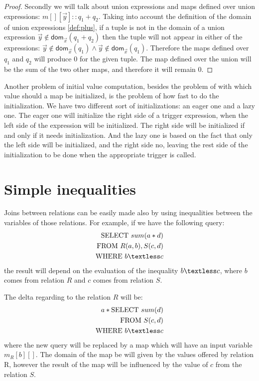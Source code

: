 \documentclass[12pt]{article}
\newcommand{\dom}{\textsf{dom}}
\begin{document}
\begin{proof}
Secondly we will talk about union expressions and maps defined over union expressions: $m[][\vec{y}]::q_1+q_2$. Taking into account the definition of the domain of union expressions \ref{def:plus}, if a tuple is not in the domain of a union expression $\vec{y}\notin\dom{}_{\vec{x}}(q_1+q_2)$ then the tuple will not appear in either of the expressions: $\vec{y}\notin\dom{}_{\vec{x}}(q_1)\land \vec{y}\notin\dom{}_{\vec{x}}(q_1)$. Therefore the maps defined over $q_1$ and $q_2$ will produce 0 for the given tuple. The map defined over the union will be the sum of the two other maps, and therefore it will remain 0.
\end{proof}

Another problem of initial value computation, besides the problem of with which value should a map be initialized, is the problem of how fast to do the initialization. We have two different sort of initializations: an eager one and a lazy one. The eager one will initialize the right side of a trigger expression, when the left side of the expression will be initialized. The right side will be initialized if and only if it needs initialization. And the lazy one is based on the fact that only the left side will be initialized, and the right side no, leaving the rest side of the initialization to be done when the appropriate trigger is called.

\section{Simple inequalities}

Joins between relations can be easily made also by using inequalities between the variables of those relations. For example, if we have the following query:
\begin{align*}
\mbox{SELECT }sum(a*d)\\
\mbox{FROM } R(a,b),S(c,d)\\
\mbox{WHERE } b\textless c 
\end{align*}
the result will depend on the evaluation of the inequality $b\textless c$, where $b$ comes from relation $R$ and $c$ comes from relation $S$.

The delta regarding to the relation $R$ will be: 
\begin{align*}
a*\mbox{SELECT }sum(d)\\
\mbox{FROM }S(c,d)\\
\mbox{WHERE } b\textless c 
\end{align*}
where the new query will be replaced by a map which will have an input variable $m_R[b][]$. The domain of the map be will given by the values offered by relation R, however the result of the map will be influenced by the value of $c$ from the relation $S$.
\end{document}
